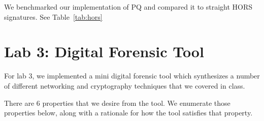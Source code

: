 \documentclass[10pt]{article}
\begin{document}
We benchmarked our implementation of PQ and compared it to straight HORS signatures. See Table~\ref{tab:hors}

\begin{comment}
flip3%
make: Nothing to be done for `all'.
verified sig 0
verified sig 1
did not verify bad msg with sig 0
keygen took 10ms
signing took 136ms
signing took 133ms
verify took 766µs
flip3%
make: Nothing to be done for `all'.
verified sig 0
verified sig 1
did not verify bad msg with sig 0
keygen took 21ms
signing took 271ms
signing took 270ms
verify took 843µs
flip3%
make: Nothing to be done for `all'.
verified sig 0
verified sig 1
did not verify bad msg with sig 0
keygen took 42ms
signing took 546ms
signing took 545ms
verify took 914µs
flip3%
make: Nothing to be done for `all'.
verified sig 0
verified sig 1
did not verify bad msg with sig 0
keygen took 83ms
signing took 1052ms
signing took 1055ms
verify took 946µs
flip3%
make: Nothing to be done for `all'.
verified sig 0
verified sig 1
did not verify bad msg with sig 0
keygen took 166ms
signing took 2145ms
signing took 2134ms
verify took 1ms
\end{comment}

\clearpage
\section{Lab 3: Digital Forensic Tool}

For lab 3, we implemented a mini digital forensic tool which synthesizes a number of different networking and cryptography techniques that we covered in class.

There are 6 properties that we desire from the tool. We enumerate those properties below, along with a rationale for how the tool satisfies that property.

\end{document}

